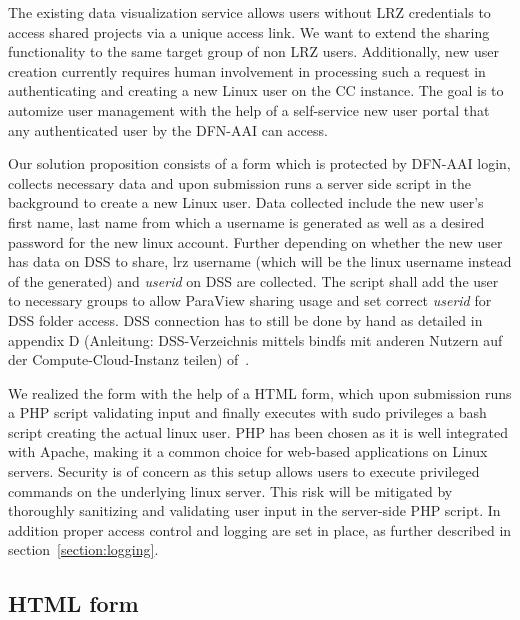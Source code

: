 The existing data visualization service allows users without LRZ credentials to
access shared projects via a unique access link. We want to extend the sharing
functionality to the same target group of non LRZ users. Additionally, new user
creation currently requires human involvement in processing such a request in
authenticating and creating a new Linux user on the CC instance. The goal is to
automize user management with the help of a self-service new user portal that
any authenticated user by the DFN-AAI can access. 

Our solution proposition consists of a form which is protected by DFN-AAI login,
collects necessary data and upon submission runs a server side script in the
background to create a new Linux user. Data collected include the new user's
first name, last name from which a username is generated as well as a desired
password for the new linux account. Further depending on whether the new user
has data on DSS to share, lrz username (which will be the linux username instead
of the generated) and \textit{userid} on DSS are collected. The script shall add
the user to necessary groups to allow ParaView sharing usage and set correct
\textit{userid} for DSS folder access. DSS connection has to still be done by
hand as detailed in appendix D (Anleitung: DSS-Verzeichnis mittels bindfs mit
anderen Nutzern auf der Compute-Cloud-Instanz teilen) of~\cite{nowak2024pvw}.

We realized the form with the help of a HTML form, which upon submission runs a
PHP script validating input and finally executes with sudo privileges a bash
script creating the actual linux user. PHP has been chosen as it is well
integrated with Apache, making it a common choice for web-based applications on
Linux servers. Security is of concern as this setup allows users to execute
privileged commands on the underlying linux server. This risk will be mitigated
by thoroughly sanitizing and validating user input in the server-side PHP
script. In addition proper access control and logging are set in place, as
further described in section~\ref{section:logging}.

\subsection{HTML form}



